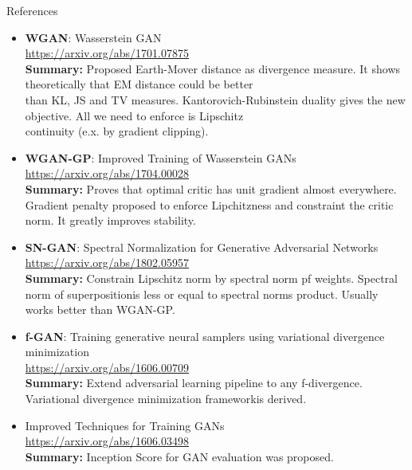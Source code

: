 \documentclass{beamer}
\begin{document}
\begin{frame}{References}
{\tiny
\begin{itemize}
	
	\item \textbf{WGAN}: Wasserstein GAN \\
	\href{https://arxiv.org/abs/1701.07875}{https://arxiv.org/abs/1701.07875} \\
	\textbf{Summary:} Proposed Earth-Mover distance as divergence measure. It shows theoretically that EM distance could be better \\ than KL, JS and TV measures. Kantorovich-Rubinstein duality gives the new objective. All we need to enforce is Lipschitz \\ continuity (e.x. by gradient clipping).
	
	\item \textbf{WGAN-GP}: Improved Training of Wasserstein GANs \\
	\href{https://arxiv.org/abs/1704.00028}{https://arxiv.org/abs/1704.00028} \\
	\textbf{Summary:} Proves that optimal critic has unit gradient almost everywhere. Gradient penalty proposed to enforce Lipchitzness and constraint the critic norm. It greatly improves stability.
	
	\item \textbf{SN-GAN}: Spectral Normalization for Generative Adversarial Networks \\
	\href{https://arxiv.org/abs/1802.05957}{https://arxiv.org/abs/1802.05957} \\
	\textbf{Summary:} Constrain Lipschitz norm by spectral norm pf weights. Spectral norm of superpositionis less or equal to spectral norms product. Usually works better than WGAN-GP. 
	
	\item \textbf{f-GAN}:  Training generative neural samplers using variational divergence minimization  \\
	\href{https://arxiv.org/abs/1606.00709}{https://arxiv.org/abs/1606.00709} \\
	\textbf{Summary:} Extend adversarial learning pipeline to any f-divergence. Variational divergence minimization frameworkis derived. 
	
	\item Improved Techniques for Training GANs \\
	\href{https://arxiv.org/abs/1606.03498}{https://arxiv.org/abs/1606.03498} \\
	\textbf{Summary:} Inception Score for GAN evaluation was proposed.
	

\end{itemize}}
\end{frame}
\end{document}

